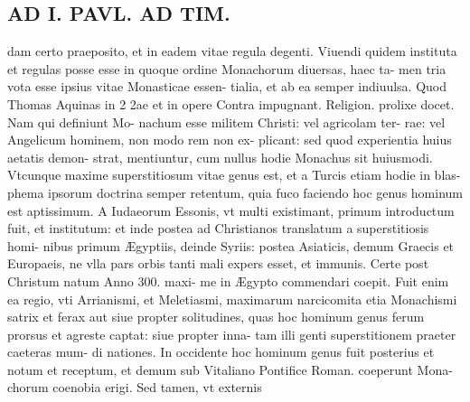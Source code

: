 \documentclass{article}
\begin{document}
\begin{pages}
\section*{AD I. PAVL. AD TIM. }
\marginpar{[ p.214 ]}\pstart dam certo praeposito, et in eadem vitae regula degenti. Viuendi quidem instituta et regulas posse esse in quoque ordine Monachorum diuersas, haec ta- men tria vota esse ipsius vitae Monasticae essen- tialia, et ab ea semper indiuulsa. Quod Thomas Aquinas in 2 2ae et in opere Contra impugnant. Religion. prolixe docet. Nam qui definiunt Mo- nachum esse militem Christi: vel agricolam ter- rae: vel Angelicum hominem, non modo rem non ex- plicant: sed quod experientia huius aetatis demon- strat, mentiuntur, cum nullus hodie Monachus sit huiusmodi. Vtcunque maxime superstitiosum vitae genus est, et a Turcis etiam hodie in blas- phema ipsorum doctrina semper retentum, quia fuco faciendo hoc genus hominum est aptissimum. A Iudaeorum Essonis, vt multi existimant, primum introductum fuit, et institutum: et inde postea ad Christianos translatum a superstitiosis homi- nibus primum Ægyptiis, deinde Syriis: postea Asiaticis, demum Graecis et Europaeis, ne vlla pars orbis tanti mali expers esset, et immunis. Certe post Christum natum Anno 300. maxi- me in Ægypto commendari coepit. Fuit enim ea regio, vti Arrianismi, et Meletiasmi, maximarum narcicomita etia Monachismi satrix et ferax aut siue propter solitudines, quas hoc hominum genus ferum prorsus et agreste captat: siue propter inna- tam illi genti superstitionem praeter caeteras mum- di nationes. In occidente hoc hominum genus fuit posterius et notum et receptum, et demum sub Vitaliano Pontifice Roman. coeperunt Mona- chorum coenobia erigi. Sed tamen, vt externis  \pend

\end{pages}
\end{document}
